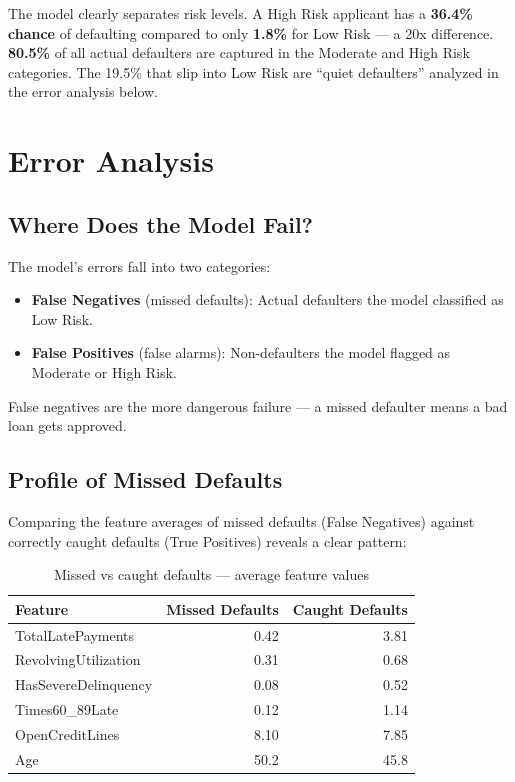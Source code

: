 \documentclass[12pt, a4paper]{article}
\begin{document}
The model clearly separates risk levels. A High Risk applicant has a \textbf{36.4\% chance} of defaulting compared to only \textbf{1.8\%} for Low Risk --- a 20x difference. \textbf{80.5\%} of all actual defaulters are captured in the Moderate and High Risk categories. The 19.5\% that slip into Low Risk are ``quiet defaulters'' analyzed in the error analysis below.

\newpage

\section{Error Analysis}

\subsection{Where Does the Model Fail?}

The model's errors fall into two categories:

\begin{itemize}[noitemsep]
    \item \textbf{False Negatives} (missed defaults): Actual defaulters the model classified as Low Risk.
    \item \textbf{False Positives} (false alarms): Non-defaulters the model flagged as Moderate or High Risk.
\end{itemize}

False negatives are the more dangerous failure --- a missed defaulter means a bad loan gets approved.

\subsection{Profile of Missed Defaults}

Comparing the feature averages of missed defaults (False Negatives) against correctly caught defaults (True Positives) reveals a clear pattern:

\begin{table}[H]
\centering
\begin{tabular}{lrr}
\toprule
\textbf{Feature} & \textbf{Missed Defaults} & \textbf{Caught Defaults} \\
\midrule
TotalLatePayments & 0.42 & 3.81 \\
RevolvingUtilization & 0.31 & 0.68 \\
HasSevereDelinquency & 0.08 & 0.52 \\
Times60\_89Late & 0.12 & 1.14 \\
OpenCreditLines & 8.10 & 7.85 \\
Age & 50.2 & 45.8 \\
\bottomrule
\end{tabular}
\caption{Missed vs caught defaults --- average feature values}
\end{table}
\end{document}
